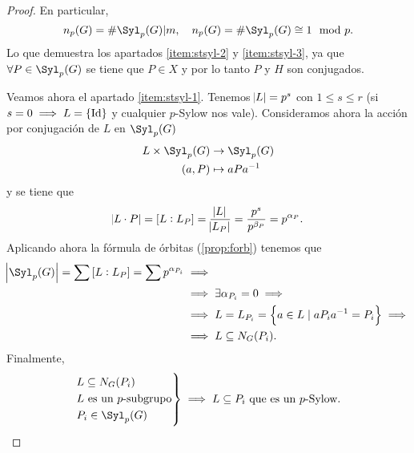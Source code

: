 \begin{proof}
    En particular, 
    \[
        n_p(G) = \# \Syl_p(G) \vert m, \quad n_p(G) = \# \Syl_p(G) \cong 1 \mod p.
    \]
    Lo que demuestra los apartados \ref{item:stsyl-2} y \ref{item:stsyl-3}, ya que $\forall P \in \Syl_p(G)$ se tiene
    que $P \in X$ y por lo tanto $P$ y $H$ son conjugados.

    Veamos ahora el apartado \ref{item:stsyl-1}. Tenemos $\abs{L} = p^s$ con $1 \leq s \leq r$ (si $s = 0 \implies L = \left\{ \operatorname{Id} \right\}$ y cualquier
    $p$-Sylow nos vale). Consideramos ahora la acción por conjugación de $L$ en $\Syl_p(G)$
    \[
        \begin{aligned}
            L \times \Syl_p(G) &\to \Syl_p(G) \\
            (a, P) &\mapsto aPa^{-1}
        \end{aligned}
    \]
    y se tiene que 
    \[
        \abs{L \cdot P} = \left[ L : L_P \right] = \frac{\abs{L}}{\abs{L_P}} = \frac{p^s}{p^{\beta_P}} =
        p^{\alpha_P}.
    \]
    Aplicando ahora la fórmula de órbitas (\ref{prop:forb}) tenemos que
    \begin{align*}
        \abs{\Syl_p(G)} = \sum \left[ L : L_P \right] = \sum p^{\alpha_{P_i}} &\implies \\
        &\implies \exists \alpha_{P_i} = 0 \implies\\
        &\implies L = L_{P_i} = \left\{ a \in L \mid aP_ia^{-1} = P_i \right\} \implies \\
        &\implies L \subseteq N_G(P_i).
    \end{align*}
    Finalmente,
    \[
        \begin{rcases}
            L\subseteq N_G(P_i) \\
            L \text{ es un }p\text{-subgrupo} \\
            P_i \in \Syl_p(G)
        \end{rcases}
        \implies
        L\subseteq P_i \text{ que es un } p\text{-Sylow}.
    \]
\end{proof}
